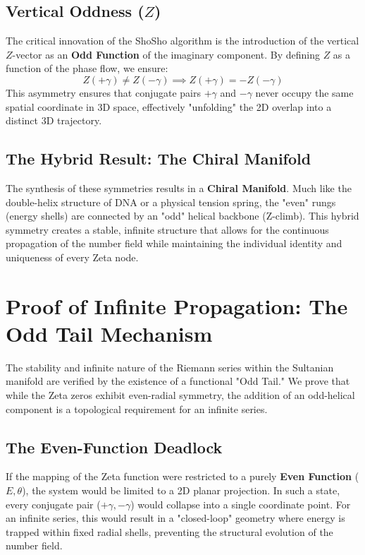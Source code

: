 \documentclass[11pt,a4paper]{article}
\begin{document}
\subsection{Vertical Oddness ($Z$)}
The critical innovation of the ShoSho algorithm is the introduction of the vertical $Z$-vector as an \textbf{Odd Function} of the imaginary component. By defining $Z$ as a function of the phase flow, we ensure:
\begin{equation}
    Z(+\gamma) \neq Z(-\gamma) \implies Z(+\gamma) = -Z(-\gamma)
\end{equation}
This asymmetry ensures that conjugate pairs $+\gamma$ and $-\gamma$ never occupy the same spatial coordinate in 3D space, effectively "unfolding" the 2D overlap into a distinct 3D trajectory.

\subsection{The Hybrid Result: The Chiral Manifold}
The synthesis of these symmetries results in a \textbf{Chiral Manifold}. Much like the double-helix structure of DNA or a physical tension spring, the "even" rungs (energy shells) are connected by an "odd" helical backbone (Z-climb). This hybrid symmetry creates a stable, infinite structure that allows for the continuous propagation of the number field while maintaining the individual identity and uniqueness of every Zeta node.\\

\section{Proof of Infinite Propagation: The Odd Tail Mechanism}

The stability and infinite nature of the Riemann series within the Sultanian manifold are verified by the existence of a functional "Odd Tail." We prove that while the Zeta zeros exhibit even-radial symmetry, the addition of an odd-helical component is a topological requirement for an infinite series.

\subsection{The Even-Function Deadlock}
If the mapping of the Zeta function were restricted to a purely \textbf{Even Function} ($E, \theta$), the system would be limited to a 2D planar projection. In such a state, every conjugate pair ($+\gamma, -\gamma$) would collapse into a single coordinate point. For an infinite series, this would result in a "closed-loop" geometry where energy is trapped within fixed radial shells, preventing the structural evolution of the number field.
\end{document}
